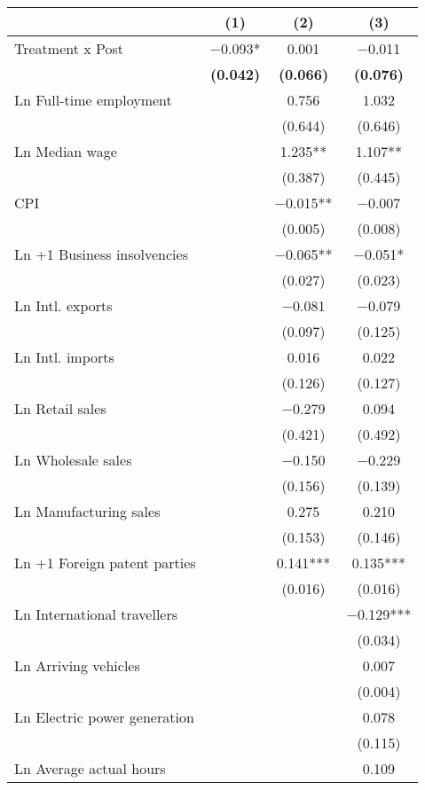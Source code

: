 
\begin{tabular}[t]{lccc}
\toprule
  & (1) & (2) & (3)\\
\midrule
Treatment x Post & \num{-0.093}* & \num{0.001} & \num{-0.011}\\
\textbf{} & \textbf{(\num{0.042})} & \textbf{(\num{0.066})} & \textbf{(\num{0.076})}\\
Ln Full-time employment &  & \num{0.756} & \num{1.032}\\
 &  & (\num{0.644}) & (\num{0.646})\\
Ln Median wage &  & \num{1.235}** & \num{1.107}**\\
 &  & (\num{0.387}) & (\num{0.445})\\
CPI &  & \num{-0.015}** & \num{-0.007}\\
 &  & (\num{0.005}) & (\num{0.008})\\
Ln +1 Business insolvencies &  & \num{-0.065}** & \num{-0.051}*\\
 &  & (\num{0.027}) & (\num{0.023})\\
Ln Intl. exports &  & \num{-0.081} & \num{-0.079}\\
 &  & (\num{0.097}) & (\num{0.125})\\
Ln Intl. imports &  & \num{0.016} & \num{0.022}\\
 &  & (\num{0.126}) & (\num{0.127})\\
Ln Retail sales &  & \num{-0.279} & \num{0.094}\\
 &  & (\num{0.421}) & (\num{0.492})\\
Ln Wholesale sales &  & \num{-0.150} & \num{-0.229}\\
 &  & (\num{0.156}) & (\num{0.139})\\
Ln Manufacturing sales &  & \num{0.275} & \num{0.210}\\
 &  & (\num{0.153}) & (\num{0.146})\\
Ln +1 Foreign patent parties &  & \num{0.141}*** & \num{0.135}***\\
 &  & (\num{0.016}) & (\num{0.016})\\
Ln International travellers &  &  & \num{-0.129}***\\
 &  &  & (\num{0.034})\\
Ln Arriving vehicles &  &  & \num{0.007}\\
 &  &  & (\num{0.004})\\
Ln Electric power generation &  &  & \num{0.078}\\
 &  &  & (\num{0.115})\\
Ln Average actual hours &  &  & \num{0.109}\\

\end{tabular}
